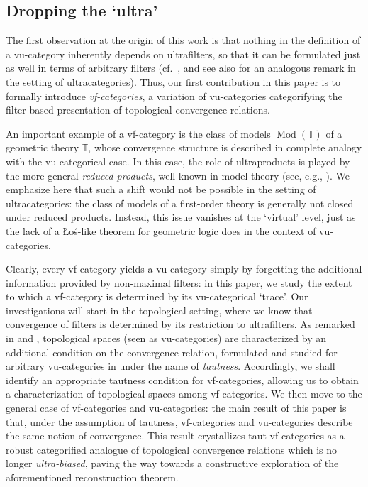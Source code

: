 \subsection*{Dropping the `ultra'}
The first observation at the origin of this work is that nothing in the definition of a vu-category inherently depends on ultrafilters, so that it can be formulated just as well in terms of arbitrary filters (cf.\ \cite[\S 5.4]{aristoteProfunctorialAlgebras2026}, and see also \cite[\S 6]{tarantinoUltracategoriesKanExtensions2025} for an analogous remark in the setting of ultracategories). Thus, our first contribution in this paper is to formally introduce \emph{vf-categories}, a variation of vu-categories categorifying the filter-based presentation of topological convergence relations. 

An important example of a vf-category is the class of models $\operatorname{Mod}(\mathbb T)$ of a geometric theory $\mathbb T$, whose convergence structure is described in complete analogy with the vu-categorical case. In this case, the role of ultraproducts is played by the more general \emph{reduced products}, well known in model theory (see, e.g., \cite[\S 6]{changModelTheory1990}). We emphasize here that such a shift would not be possible in the setting of ultracategories: the class of models of a first-order theory is generally not closed under reduced products. Instead, this issue vanishes at the `virtual' level, just as the lack of a \L o\'s-like theorem for geometric logic does in the context of vu-categories.

Clearly, every vf-category yields a vu-category simply by forgetting the additional information provided by non-maximal filters: in this paper, we study the extent to which a vf-category is determined by its vu-categorical `trace'.
Our investigations will start in the topological setting, where we know that convergence of filters is determined by its restriction to ultrafilters. As remarked in \cite[Rem.\ 3.14]{vangoolToposesEnoughPoints2026} and \cite[Thm.\ 5.5]{hamadGeneralisedUltracategoriesConceptual2025}, topological spaces (seen as vu-categories) are characterized by an additional condition on the convergence relation, formulated and studied for arbitrary vu-categories in \cite{saadiaGeometricMorphismsVirtual2026} under the name of \emph{tautness}. Accordingly, we shall identify an appropriate tautness condition for vf-categories, allowing us to obtain a characterization of topological spaces among vf-categories. 
We then move to the general case of vf-categories and vu-categories: the main result of this paper is that, under the assumption of tautness, vf-categories and vu-categories describe the same notion of convergence. This result crystallizes taut vf-categories as a robust categorified analogue of topological convergence relations which is no longer \emph{ultra-biased}, paving the way towards a constructive exploration of the aforementioned reconstruction theorem.


